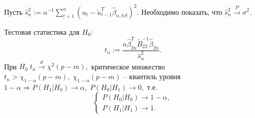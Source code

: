 \begin{problem}
    Пусть $\hat{s}_n^2 := n^{-1}\sum\limits_{t = 1}^n(u_t - \tilde{u}_{t - 1}^T \hat{\beta}_{n, hS})^2$. Необходимо показать, что $\hat{s}_n^2 \stackrel{P}{\to} \sigma^2.$
\end{problem}
Тестовая статистика для $H_0$:
$$t_n := \dfrac{n\hat{\beta}_{2n}^T \tilde{B}_{22}^{-1} \hat{\beta}_{2n}}{\hat{s}_n^2}.$$
При $H_0 \; t_n \stackrel{d}{\to} \chi^2(p - m),$ критическое множество $t_n > \chi_{1 - \alpha}(p - m), \; \chi_{1 - \alpha}(p - m)$ -- квантиль уровня $1 - \alpha \Longrightarrow P(H_1|H_0) \to \alpha, \; P(H_0|H_1) \to 0,$ т.е.
$$\begin{cases}
    P(H_0|H_0) \to 1 - \alpha,\\
    P(H_1|H_1) \to 1.
\end{cases}$$